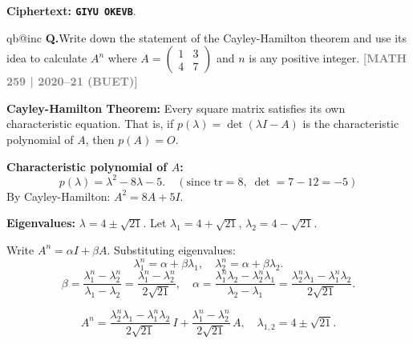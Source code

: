\documentclass[12pt,a3paper]{article}
\makeatletter
\newcommand{\yr}[1]{\hfill\textcolor{gray}{\small\textbf{[#1]}}}
\newcounter{qnum}
\newcommand{\Q}[1]{%
  \csname qb@inc\endcsname
  \needspace{4\baselineskip}
  \refstepcounter{qnum}
  \vspace{6pt}
  \noindent\textbf{Q\theqnum.}\enspace #1\par
}
\makeatother
\begin{document}
\begin{tcolorbox}
\textbf{Ciphertext: \texttt{GIYU OKEVB}}.
 
\end{tcolorbox}
 
 

\Q{Write down the statement of the Cayley-Hamilton theorem and use its idea to calculate $A^n$ where $A = \begin{pmatrix} 1 & 3 \\ 4 & 7 \end{pmatrix}$ and $n$ is any positive integer.
\yr{MATH 259 | 2020--21 (BUET)}}

\begin{tcolorbox}[enhanced,breakable,
  colback=cA!4,colframe=cA,boxrule=0.8pt,arc=5pt,
  title={\textbf{Answer --- Cayley-Hamilton Theorem; $A^n$ for $A=\begin{pmatrix}1&3\\4&7\end{pmatrix}$}},
  fonttitle=\bfseries\color{white},colbacktitle=cA]
 
\textbf{Cayley-Hamilton Theorem:} Every square matrix satisfies its own characteristic equation. That is, if $p(\lambda)=\det(\lambda I-A)$ is the characteristic polynomial of $A$, then $p(A)=O$.
 
\medskip
\textbf{Characteristic polynomial of $A$:}
\[
p(\lambda) = \lambda^2 - 8\lambda - 5. \quad (\text{since }\mathrm{tr}=8,\;\det=7-12=-5)
\]
By Cayley-Hamilton: $A^2 = 8A + 5I$.
 
\textbf{Eigenvalues:} $\lambda = 4\pm\sqrt{21}$. Let $\lambda_1=4+\sqrt{21}$, $\lambda_2=4-\sqrt{21}$.
 
Write $A^n = \alpha I + \beta A$. Substituting eigenvalues:
\[
\lambda_1^n = \alpha + \beta\lambda_1,\quad \lambda_2^n = \alpha + \beta\lambda_2.
\]
\[
\beta = \frac{\lambda_1^n - \lambda_2^n}{\lambda_1 - \lambda_2} = \frac{\lambda_1^n - \lambda_2^n}{2\sqrt{21}},\quad
\alpha = \frac{\lambda_1^n\lambda_2 - \lambda_2^n\lambda_1}{\lambda_2 - \lambda_1} = \frac{\lambda_2^n\lambda_1 - \lambda_1^n\lambda_2}{2\sqrt{21}}.
\]
 
\[
\boxed{A^n = \frac{\lambda_2^n\lambda_1-\lambda_1^n\lambda_2}{2\sqrt{21}}\,I + \frac{\lambda_1^n-\lambda_2^n}{2\sqrt{21}}\,A,\quad\lambda_{1,2}=4\pm\sqrt{21}.}
\]
 
\end{tcolorbox}
 
\end{document}
